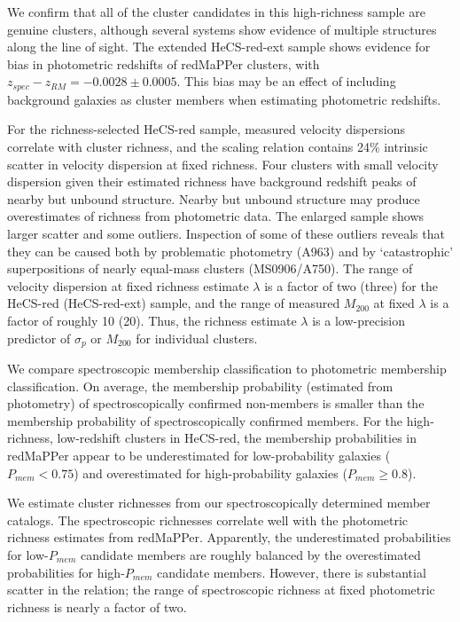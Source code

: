 We confirm that all of the cluster candidates 
in this high-richness sample are genuine clusters, although several 
systems show evidence of multiple structures along the line of sight.
The extended HeCS-red-ext sample shows evidence for bias in photometric redshifts 
of redMaPPer clusters, with $z_{spec}-z_{RM}=-0.0028\pm0.0005$.
This bias may be an effect of including background galaxies as cluster members when estimating photometric redshifts.

For the richness-selected HeCS-red sample, measured velocity dispersions 
correlate with cluster richness, and the 
scaling relation contains 24\% intrinsic scatter in velocity dispersion 
at fixed richness. Four clusters with small velocity dispersion given their 
estimated richness have background redshift peaks of nearby but unbound structure.
Nearby but unbound structure may produce overestimates of richness from photometric data.
The enlarged sample shows larger scatter and some outliers. 
Inspection of some of these outliers reveals that they can be 
caused both by problematic photometry (A963) and by `catastrophic' superpositions
of nearly equal-mass clusters (MS0906/A750). 
The range of velocity dispersion at fixed richness estimate $\lambda$ is a factor 
of two (three) for the HeCS-red (HeCS-red-ext) sample, and the range of 
measured $M_{200}$ at fixed $\lambda$ is a factor of roughly 10 (20). 
Thus, the richness estimate $\lambda$ is a low-precision predictor of 
$\sigma_p$ or $M_{200}$ for individual clusters. 

We compare spectroscopic membership classification to photometric membership
classification.  On average, the membership probability (estimated from photometry) of 
spectroscopically confirmed non-members is smaller than the 
membership probability of spectroscopically confirmed members. For the high-richness, 
low-redshift clusters in HeCS-red, the membership probabilities in redMaPPer appear 
to be underestimated for low-probability galaxies ($P_{mem}<0.75$)
and overestimated for high-probability galaxies ($P_{mem}\geq 0.8$). 

We estimate cluster richnesses from our spectroscopically determined member
catalogs.  The spectroscopic richnesses correlate well with the photometric 
richness estimates from redMaPPer.  Apparently, 
the underestimated probabilities for low-$P_{mem}$ candidate members 
are roughly balanced by the overestimated probabilities for high-$P_{mem}$
candidate members.
However, there is substantial scatter in the relation; the range of 
spectroscopic richness at fixed photometric richness is nearly a factor of two.  

